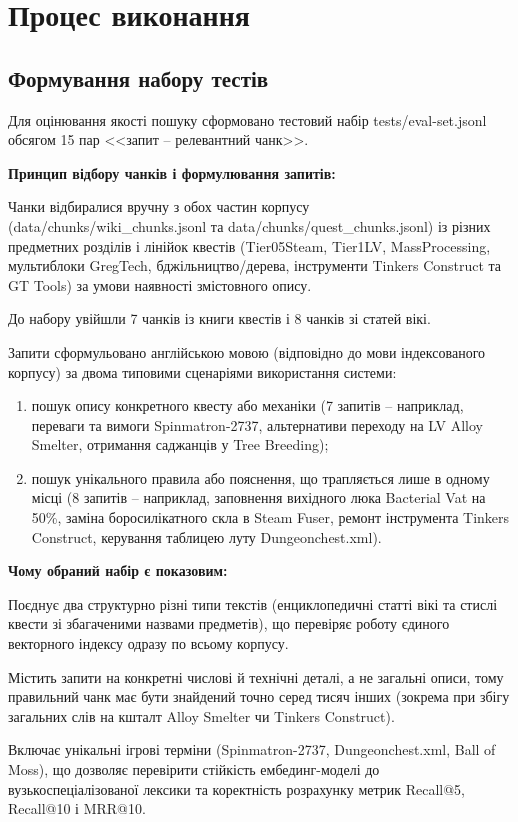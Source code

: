 \chapter{Процес виконання}
\section{Формування набору тестів}

Для оцінювання якості пошуку сформовано тестовий набір tests/eval-set.jsonl обсягом 15 пар <<запит -- релевантний чанк>>.

\textbf{Принцип відбору чанків і формулювання запитів:}
\begin{dashlist}[wide]
    \item Чанки відбиралися вручну з обох частин корпусу (data/chunks/wiki\_chunks.jsonl та data/chunks/quest\_chunks.jsonl) із різних предметних розділів і лінійок квестів (Tier05Steam, Tier1LV, MassProcessing, мультиблоки GregTech, бджільництво/дерева, інструменти Tinkers Construct та GT Tools) за умови наявності змістовного опису.
    \item До набору увійшли 7 чанків із книги квестів і 8 чанків зі статей вікі.
    \item Запити сформульовано англійською мовою (відповідно до мови індексованого корпусу) за двома типовими сценаріями використання системи:
    \begin{enumerate}[wide]
        \item пошук опису конкретного квесту або механіки (7 запитів -- наприклад, переваги та вимоги Spinmatron-2737, альтернативи переходу на LV Alloy Smelter, отримання саджанців у Tree Breeding);
        \item пошук унікального правила або пояснення, що трапляється лише в одному місці (8 запитів -- наприклад, заповнення вихідного люка Bacterial Vat на 50\%, заміна боросилікатного скла в Steam Fuser, ремонт інструмента Tinkers Construct, керування таблицею луту Dungeonchest.xml).
    \end{enumerate}
\end{dashlist}

\textbf{Чому обраний набір є показовим:}
\begin{dashlist}[wide]
    \item Поєднує два структурно різні типи текстів (енциклопедичні статті вікі та стислі квести зі збагаченими назвами предметів), що перевіряє роботу єдиного векторного індексу одразу по всьому корпусу.
    \item Містить запити на конкретні числові й технічні деталі, а не загальні описи, тому правильний чанк має бути знайдений точно серед тисяч інших (зокрема при збігу загальних слів на кшталт Alloy Smelter чи Tinkers Construct).
    \item Включає унікальні ігрові терміни (Spinmatron-2737, Dungeonchest.xml, Ball of Moss), що дозволяє перевірити стійкість ембединг-моделі до вузькоспеціалізованої лексики та коректність розрахунку метрик Recall@5, Recall@10 і MRR@10.
\end{dashlist}


